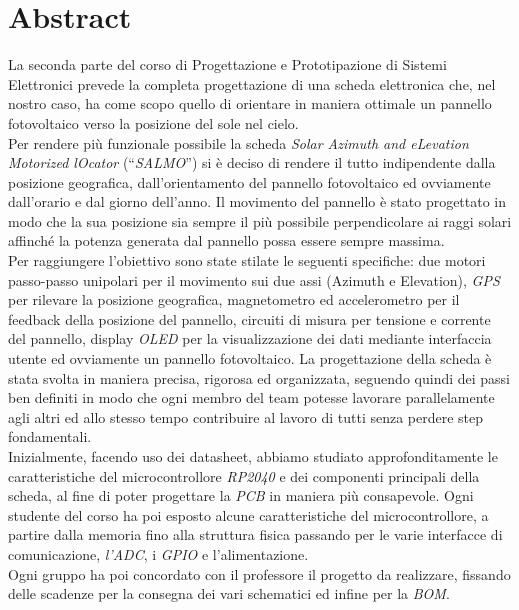 \chapter{Abstract}

La seconda parte del corso di Progettazione e Prototipazione di Sistemi
Elettronici prevede la completa progettazione di una scheda elettronica
che, nel nostro caso, ha come scopo quello di orientare in maniera
ottimale un pannello fotovoltaico verso la posizione del sole nel
cielo.\\
Per rendere più funzionale possibile la scheda \textit{Solar Azimuth and eLevation Motorized lOcator} (``\emph{SALMO}'') si è deciso di
rendere il tutto indipendente dalla posizione geografica, dall'orientamento del pannello fotovoltaico ed ovviamente
dall'orario e dal giorno dell'anno. Il movimento del pannello è stato
progettato in modo che la sua posizione sia sempre il più possibile
perpendicolare ai raggi solari affinché la potenza generata dal pannello
possa essere sempre massima.\\
Per raggiungere l'obiettivo sono state stilate le seguenti specifiche:
due motori passo-passo unipolari per il movimento sui due assi (Azimuth
e Elevation), \emph{GPS} per rilevare la posizione geografica,
magnetometro ed accelerometro per il feedback della posizione del
pannello, circuiti di misura per tensione e corrente del pannello,
display \textit{OLED} per la visualizzazione dei dati mediante interfaccia utente
ed ovviamente un pannello fotovoltaico.
La progettazione della scheda è stata svolta in maniera precisa,
rigorosa ed organizzata, seguendo quindi dei passi ben definiti in modo
che ogni membro del team potesse lavorare parallelamente agli altri ed
allo stesso tempo contribuire al lavoro di tutti senza perdere step
fondamentali.\\
Inizialmente, facendo uso dei datasheet, abbiamo studiato
approfonditamente le caratteristiche del microcontrollore \emph{RP2040}
e dei componenti principali della scheda, al fine di poter progettare la
\emph{PCB} in maniera più consapevole. Ogni studente del corso ha poi
esposto alcune caratteristiche del microcontrollore, a partire dalla
memoria fino alla struttura fisica passando per le varie interfacce di
comunicazione, \emph{l'ADC}, i \emph{GPIO} e l'alimentazione.\\
Ogni gruppo ha poi concordato con il professore il progetto da
realizzare, fissando delle scadenze per la consegna dei vari schematici
ed infine per la \emph{BOM}.\\
